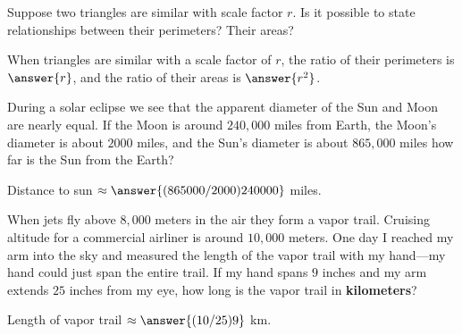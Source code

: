 \documentclass[nooutcomes]{ximera}
\begin{document}
\begin{question}
Suppose two triangles are similar with scale factor $r$. Is it possible to state relationships between their perimeters?  Their areas?
\begin{multipleChoice}
\end{multipleChoice}
\begin{question}
When triangles are similar with a scale factor of $r$, 
the ratio of their perimeters is $\answer{r}$, and  
the ratio of their areas is $\answer{r^2}$. 
\end{question}
\end{question}

\begin{question}
During a solar eclipse we see that the apparent diameter of the
  Sun and Moon are nearly equal. If the Moon is around $240,000$ miles
  from Earth, the Moon's diameter is about $2000$ miles, and the Sun's
  diameter is about $865,000$ miles how far is the Sun from the Earth?

Distance to sun $\approx \answer{(865000/2000)240000}$ miles. 
\end{question}

\begin{question}
When jets fly above $8,000$ meters in the air they form a vapor
  trail. Cruising altitude for a commercial airliner is around $10,000$
  meters. One day I reached my arm into the sky and measured the
  length of the vapor trail with my hand---my hand could just span the
  entire trail. If my hand spans $9$ inches and my arm extends $25$
  inches from my eye, how long is the vapor trail in \textbf{kilometers}? 

Length of vapor trail $\approx \answer{(10/25)9}$ km. 
\end{question}
\end{document}
